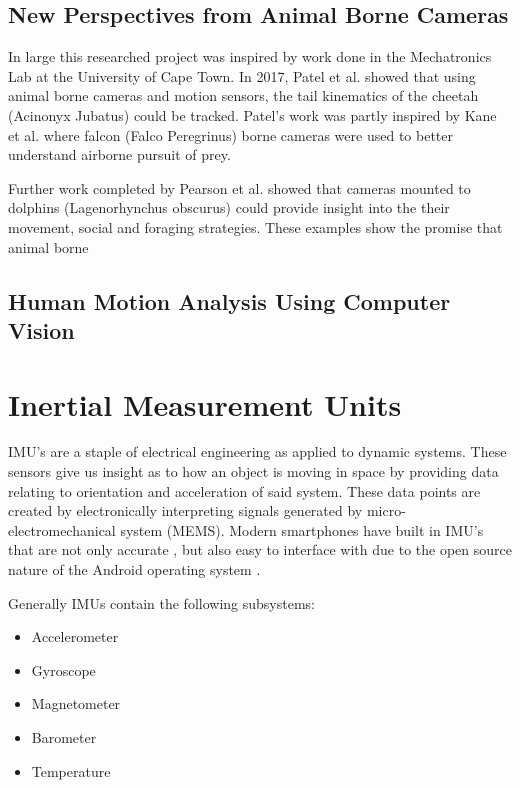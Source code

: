 \subsection{New Perspectives from Animal Borne Cameras}
In large this researched project was inspired by work done in the Mechatronics Lab at the University of Cape Town. In 2017, Patel et al.  \cite{patel2017trackingieee} showed that using animal borne cameras and motion sensors, the tail kinematics of the cheetah (Acinonyx Jubatus) could be tracked. Patel's work was partly inspired by Kane et al. \cite{kane2014falcons} where falcon (Falco Peregrinus) borne cameras were used to better understand airborne pursuit of prey.

Further work completed by Pearson et al. \cite{pearson2017testing} showed that cameras mounted to dolphins (Lagenorhynchus obscurus) could provide insight into the their movement, social and foraging strategies. These examples show the promise that animal borne 

\subsection{Human Motion Analysis Using Computer Vision}



\section{Inertial Measurement Units}
IMU's are a staple of electrical engineering as applied to dynamic systems. These sensors give us insight as to how an object is moving in space by providing data relating to orientation and acceleration of said system. These data points are created by electronically interpreting signals generated by micro-electromechanical system (MEMS). Modern smartphones have built in IMU's that are not only accurate \cite{gikas2016rigorous}, but also easy to interface with due to the open source nature of the Android operating system \cite{androidSensorLib}.  

Generally IMUs contain the following subsystems:
\begin{itemize}
\item Accelerometer
\item Gyroscope
\item Magnetometer
\item Barometer
\item Temperature
\end{itemize}

